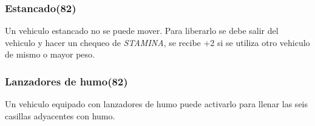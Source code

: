         \subsubsection{Estancado(82)}
        Un vehiculo estancado no se puede mover. Para liberarlo se debe salir del vehiculo y hacer un chequeo de \emph{STAMINA}, se recibe +2 si se utiliza otro vehiculo de mismo o mayor peso.

        \subsubsection{Lanzadores de humo(82)}
        Un vehiculo equipado con lanzadores de humo puede activarlo para llenar las seis casillas adyacentes con humo.
